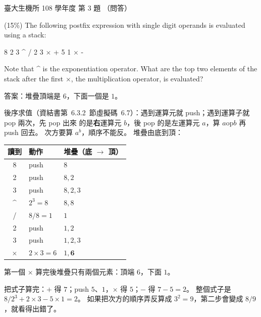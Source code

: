 \begin{pastexam}[label={px:ntu-108-bime-ds-03}]{臺大生機所 108 學年度 第 3 題}
（問答）

(15\%) The following postfix expression with single digit operands is evaluated using a stack:

\hspace*{2em}8 2 3 \^{} / 2 3 $\times$ + 5 1 $\times$ -

Note that \^{} is the exponentiation operator. What are the top two elements of the stack after
the first $\times$, the multiplication operator, is evaluated?
\end{pastexam}

\begin{pastsoln}
答案：堆疊頂端是 $6$，下面一個是 $1$。

後序求值（資結書第~6.3.2~節虛擬碼~6.7）：遇到運算元就 push；遇到運算子就 pop 兩次，先 pop 出來
的是\textbf{右}運算元 $b$，後 pop 的是左運算元 $a$，算 $a \mathbin{\mathrm{op}} b$ 再 push 回去。
次方要算 $a^b$，順序不能反。 堆疊由底到頂：
\begin{center}
\begin{tabular}{cll}
\toprule
讀到 & 動作 & 堆疊（底 $\to$ 頂） \\
\midrule
8 & push & $8$ \\
2 & push & $8, 2$ \\
3 & push & $8, 2, 3$ \\
\^{} & $2^3 = 8$ & $8, 8$ \\
/ & $8 / 8 = 1$ & $1$ \\
2 & push & $1, 2$ \\
3 & push & $1, 2, 3$ \\
$\times$ & $2 \times 3 = 6$ & $1, \mathbf{6}$ \\
\bottomrule
\end{tabular}
\end{center}
第一個 $\times$ 算完後堆疊只有兩個元素：頂端 $6$，下面 $1$。

把式子算完：$+$ 得 $7$；push $5$、$1$，$\times$ 得 $5$；$-$ 得 $7 - 5 = 2$。 整個式子是
$8 / 2^3 + 2 \times 3 - 5 \times 1 = 2$。 如果把次方的順序弄反算成 $3^2 = 9$，第二步會變成
$8 / 9$，就看得出錯了。
\end{pastsoln}
